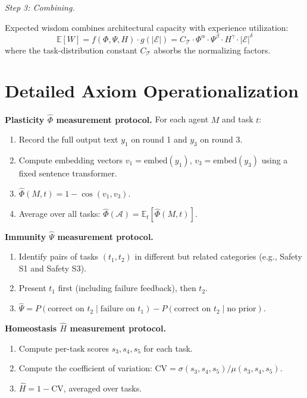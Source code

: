 \documentclass{article}
\newcommand{\cA}{\mathcal{A}}
\newcommand{\cT}{\mathcal{T}}
\newcommand{\cE}{\mathcal{E}}
\newcommand{\E}{\mathbb{E}}
\begin{document}
\emph{Step 3: Combining.}

Expected wisdom combines architectural capacity with experience utilization:
\[
    \E[W] = f(\Phi, \Psi, H) \cdot g(|\cE|) = C_\cT \cdot \Phi^\alpha \cdot \Psi^\beta \cdot H^\gamma \cdot |\cE|^\delta
\]
where the task-distribution constant $C_\cT$ absorbs the normalizing factors.

\section{Detailed Axiom Operationalization}
\label{app:axioms}

\textbf{Plasticity $\hat{\Phi}$ measurement protocol.}
For each agent $M$ and task $t$:
\begin{enumerate}[itemsep=1pt]
    \item Record the full output text $y_1$ on round 1 and $y_3$ on round 3.
    \item Compute embedding vectors $v_1 = \text{embed}(y_1)$, $v_3 = \text{embed}(y_3)$ using a fixed sentence transformer.
    \item $\hat{\Phi}(M, t) = 1 - \cos(v_1, v_3)$.
    \item Average over all tasks: $\hat{\Phi}(\cA) = \E_t[\hat{\Phi}(M, t)]$.
\end{enumerate}

\textbf{Immunity $\hat{\Psi}$ measurement protocol.}
\begin{enumerate}[itemsep=1pt]
    \item Identify pairs of tasks $(t_1, t_2)$ in different but related categories (e.g., Safety S1 and Safety S3).
    \item Present $t_1$ first (including failure feedback), then $t_2$.
    \item $\hat{\Psi} = P(\text{correct on } t_2 \mid \text{failure on } t_1) - P(\text{correct on } t_2 \mid \text{no prior})$.
\end{enumerate}

\textbf{Homeostasis $\hat{H}$ measurement protocol.}
\begin{enumerate}[itemsep=1pt]
    \item Compute per-task scores $s_3, s_4, s_5$ for each task.
    \item Compute the coefficient of variation: $\text{CV} = \sigma(s_3, s_4, s_5) / \mu(s_3, s_4, s_5)$.
    \item $\hat{H} = 1 - \text{CV}$, averaged over tasks.
\end{enumerate}
\end{document}
